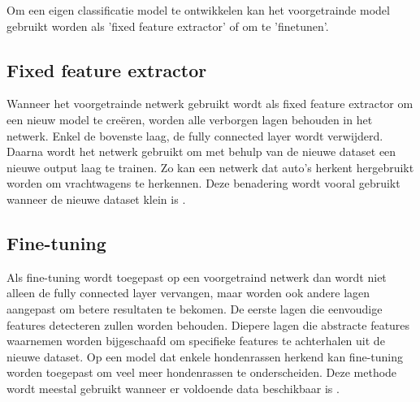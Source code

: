 Om een eigen classificatie model te ontwikkelen kan het voorgetrainde model gebruikt worden als 'fixed feature extractor' of om te 'finetunen'.

\subsection{Fixed feature extractor}
\label{ssec:Fixed feature extractor}

Wanneer het voorgetrainde netwerk gebruikt wordt als fixed feature extractor om een nieuw model te creëren, worden alle verborgen lagen behouden in het netwerk. Enkel de bovenste laag, de fully connected layer wordt verwijderd. Daarna wordt het netwerk gebruikt om met behulp van de nieuwe dataset een nieuwe output laag te trainen. Zo kan een netwerk dat auto’s herkent hergebruikt worden om vrachtwagens te herkennen. Deze benadering wordt vooral gebruikt wanneer de nieuwe dataset klein is \autocite{webcourse}.

\subsection{Fine-tuning}
\label{ssec:Fine-tuning}

Als fine-tuning wordt toegepast op een voorgetraind netwerk dan wordt niet alleen de fully connected layer vervangen, maar worden ook andere lagen aangepast om betere resultaten te bekomen. De eerste lagen die eenvoudige features detecteren zullen worden behouden. Diepere lagen die abstracte features waarnemen worden bijgeschaafd om specifieke features te achterhalen uit de nieuwe dataset. Op een model dat enkele hondenrassen herkend kan fine-tuning worden toegepast om veel meer hondenrassen te onderscheiden. Deze methode wordt meestal gebruikt wanneer er voldoende data beschikbaar is \autocite{cs231n}.

